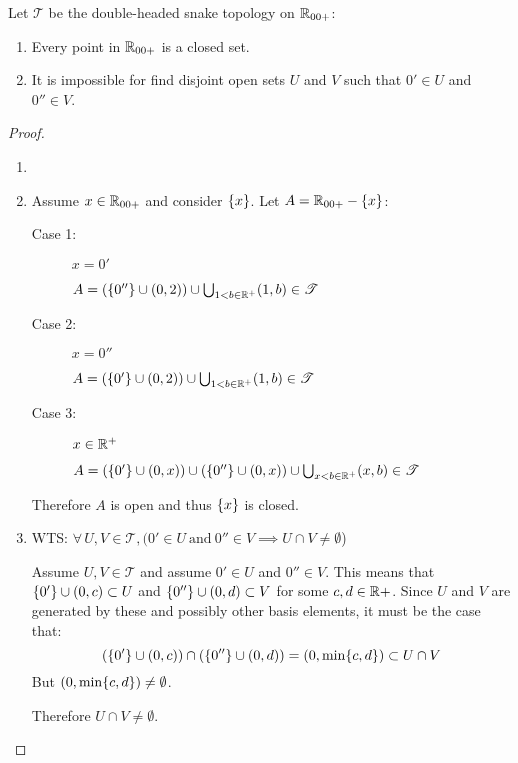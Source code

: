 \documentclass[letterpaper,12pt,fleqn]{article}
\newcommand{\T}{\mathscr{T}}
\begin{document}
\begin{theorem}
  Let \(\T\) be the double-headed snake topology on \(\mathbb{R}_{00+}\):
  \begin{enumerate}
  \item Every point in \(\mathbb{R}_{00+}\) is a closed set.
  \item It is impossible for find disjoint open sets \(U\) and \(V\) such that \(0'\in U\) and \(0''\in V\).
  \end{enumerate}
\end{theorem}

\begin{proof}
  \begin{enumerate}
  \item[]
  \item Assume \(x\in\mathbb{R}_{00+}\) and consider \(\{x\}\).  Let \(A=\mathbb{R}_{00+}-\{x\}\):

    \begin{description}
    \item[Case 1:] \(x=0'\)

      \(A=(\set{0''}\cup(0,2))\cup\bigcup_{1<b\in\R^+}(1,b)\in\T\)
      
    \item[Case 2:] \(x=0''\)

      \(A=(\set{0'}\cup(0,2))\cup\bigcup_{1<b\in\R^+}(1,b)\in\T\)

    \item[Case 3:] \(x\in\mathbb{R}^+\)

      \(A=(\set{0'}\cup(0,x))\cup(\set{0''}\cup(0,x))\cup\bigcup_{x<b\in\R^+}(x,b)\in\T\)
    \end{description}

    Therefore \(A\) is open and thus \(\{x\}\) is closed.

  \item WTS: \(\forall\,U,V\in\T,(0'\in U\ \text{and}\ 0''\in V\implies U\cap V\ne\emptyset\))

    Assume \(U,V\in\T\) and assume \(0'\in U\) and \(0''\in V\).  This means that \(\{0'\}\cup(0,c)\subset U\)
    and \(\{0''\}\cup(0,d)\subset V\) for some \(c,d\in\mathbb{R}+\).  Since \(U\) and \(V\) are generated by these and
    possibly other basis elements, it must be the case that:
    \[(\{0'\}\cup(0,c))\cap(\{0''\}\cup(0,d))=(0,\min\{c,d\})\subset{U\cap V}\]
    But \((0,\min\{c,d\})\ne\emptyset\).

    Therefore \(U\cap V\ne\emptyset\).
  \end{enumerate}
\end{proof}
\end{document}
